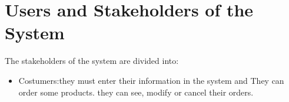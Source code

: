 \section{Users and Stakeholders of the System}
The stakeholders of the system are divided into:
\begin{itemize}
	\item Costumers:they must enter their information in the system and They can order some products. they can see, modify or cancel their orders.
\end{itemize}